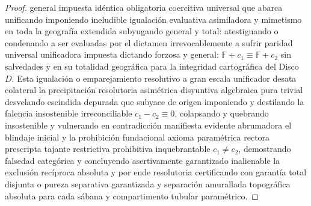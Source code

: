 \documentclass[11pt,a4paper]{article}
\theoremstyle{definition}
\theoremstyle{remark}
\numberwithin{equation}{section}
\begin{document}
\begin{proof}
general impuesta idéntica obligatoria coercitiva universal que abarca unificando imponiendo ineludible igualación evaluativa asimiladora y mimetismo en toda la geografía extendida subyugando general y total: atestiguando o condenando a ser evaluadas por el dictamen irrevocablemente a sufrir paridad universal unificadora impuesta dictando forzosa y general: $\mathbb{F} + c_1 \equiv \mathbb{F} + c_2$ sin salvedades y en su totalidad geográfica para la integridad cartográfica del Disco $D$. Esta igualación o emparejamiento resolutivo a gran escala unificador desata colateral la precipitación resolutoria asimétrica disyuntiva algebraica pura trivial desvelando escindida depurada que subyace de origen imponiendo y destilando la falencia insostenible irreconciliable $c_1 - c_2 \equiv 0$, colapsando y quebrando insostenible y vulnerando en contradicción manifiesta evidente abrumadora el blindaje inicial y la prohibición fundacional axioma paramétrica rectora prescripta tajante restrictiva prohibitiva inquebrantable $c_1 \neq c_2$, demostrando falsedad categórica y concluyendo asertivamente garantizado inalienable la exclusión recíproca absoluta y por ende resolutoria certificando con garantía total disjunta o pureza separativa garantizada y separación amurallada topográfica absoluta para cada sábana y compartimento tubular paramétrico.


\end{proof}
\end{document}
